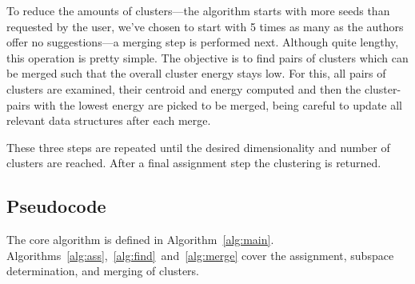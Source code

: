 \documentclass[english]{scrartcl}
\begin{document}
To reduce the amounts of clusters---the algorithm starts with more seeds than
requested by the user, we've chosen to start with 5 times as many as the
authors offer no suggestions---a merging step is performed next. Although quite
lengthy, this operation is pretty simple. The objective is to find pairs of
clusters which can be merged such that the overall cluster energy stays low.
For this, all pairs of clusters are examined, their centroid and energy
computed and then the cluster-pairs with the lowest energy are picked to be merged, being
careful to update all relevant data structures after each merge.

These three steps are repeated until the desired dimensionality and number of
clusters are reached. After a final assignment step the clustering is returned.

\subsection{Pseudocode}

The core algorithm is defined in Algorithm~\ref{alg:main}. Algorithms~\ref{alg:ass},~\ref{alg:find}~and~\ref{alg:merge}
cover the assignment, subspace determination, and merging of clusters.
\end{document}
